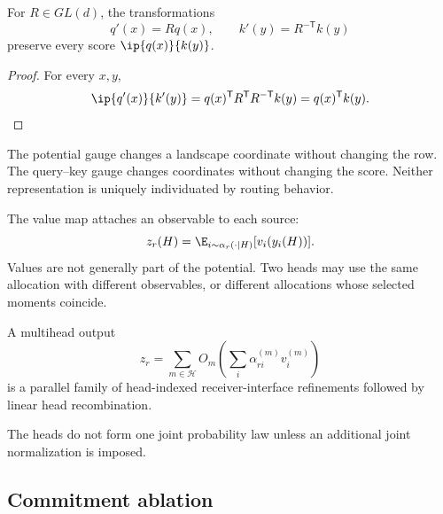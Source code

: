\begin{lemma}\label{lem:qk-gauge}
For $R\in GL(d)$, the transformations
\[
q'(x)=Rq(x),
\qquad
k'(y)=R^{-\mathsf T}k(y)
\]
preserve every score $\ip{q(x)}{k(y)}$.
\end{lemma}

\begin{proof}
For every $x,y$,
\[
\ip{q'(x)}{k'(y)}
=q(x)^{\mathsf T}R^{\mathsf T}R^{-\mathsf T}k(y)
=q(x)^{\mathsf T}k(y).
\]
\end{proof}

The potential gauge changes a landscape coordinate without changing the row. The query--key gauge changes coordinates without changing the score. Neither representation is uniquely individuated by routing behavior.

The value map attaches an observable to each source:
\[
z_r(H)=\E_{i\sim\alpha_r(\cdot\mid H)}[v_i(y_i(H))].
\]
Values are not generally part of the potential. Two heads may use the same allocation with different observables, or different allocations whose selected moments coincide.

\begin{corollary}\label{cor:multihead}
A multihead output
\[
z_r
=
\sum_{m\in\mathcal H}O_m\left(\sum_i\alpha_{ri}^{(m)}v_i^{(m)}\right)
\]
is a parallel family of head-indexed receiver-interface refinements followed by linear head recombination.
\end{corollary}

The heads do not form one joint probability law unless an additional joint normalization is imposed.

\subsection{Commitment ablation}

